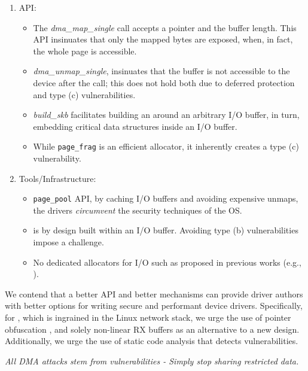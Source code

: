 \begin{enumerate}
    \item API: 
    \begin{itemize}
        \item The \textit{dma\_map\_single} call accepts a pointer and the buffer length. This API insinuates that only the mapped bytes are exposed, when, in fact, the whole page is accessible.
        \item \textit{dma\_unmap\_single}, insinuates that the buffer is not accessible to the device after the call; this does not hold both due to deferred protection and type (c) \subpage{} vulnerabilities.
        \item \textit{build\_skb} facilitates building an \skb{} around an arbitrary I/O buffer, in turn, embedding critical data structures inside an I/O buffer.
        \item While \texttt{page\_frag} is an efficient allocator, it inherently creates a type (c) \subpage{} vulnerability.
    \end{itemize} 
    \item Tools/Infrastructure: 
    \begin{itemize}
            \item \texttt{page\_pool} API, by caching I/O buffers and avoiding expensive unmaps, the drivers \emph{circumvent} the security techniques of the OS. 
            \item \shinfo{} is by design built within an I/O buffer. Avoiding type (b) \subpage{} vulnerabilities impose a challenge.
            \item No dedicated allocators for I/O such as proposed in previous works (e.g., \cite{MSMT18,MMT16}).
    \end{itemize}
\end{enumerate}

We contend that a better API and better mechanisms can provide driver authors with better options for writing secure and performant device drivers. Specifically, for \shinfo{}, which is ingrained in the Linux network stack, we urge the use of pointer obfuscation \cite{Coo17}, and solely non-linear RX buffers as an alternative to a new design. Additionally, we urge the use of static code analysis that detects \subpage{} vulnerabilities.

\emph{All DMA attacks stem from \subpage{} vulnerabilities - Simply stop sharing restricted data.}


